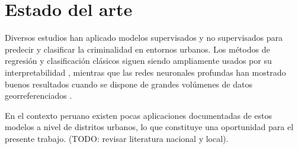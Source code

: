 
\section{Estado del arte}

\label{sec:estado_del_arte}

Diversos estudios han aplicado modelos supervisados y no supervisados
para predecir y clasificar la criminalidad en entornos urbanos. Los
métodos de regresión y clasificación clásicos siguen siendo ampliamente
usados por su interpretabilidad \parencite{james2013introduction},
mientras que las redes neuronales profundas han mostrado buenos resultados
cuando se dispone de grandes volúmenes de datos georreferenciados
\parencite{goodfellow2016deep}.

En el contexto peruano existen pocas aplicaciones documentadas de
estos modelos a nivel de distritos urbanos, lo que constituye una
oportunidad para el presente trabajo. (TODO: revisar literatura nacional
y local).
